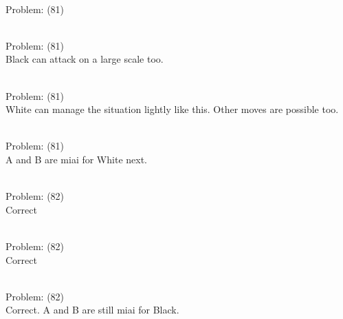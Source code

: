 \documentclass[11pt]{article}
\begin{document}
\begin{minipage}[t]{0.5\textwidth}
  {\centering
  
\\
Problem: (81)\\
  }
\end{minipage}
\begin{minipage}[t]{0.5\textwidth}
  {\centering
  
\\
Problem: (81)\\
Black can attack on a large scale too.\\
  }
\end{minipage}
\begin{minipage}[t]{0.5\textwidth}
  {\centering
  
\\
Problem: (81)\\
White can manage the situation lightly like this. Other moves are possible too.\\
  }
\end{minipage}
\begin{minipage}[t]{0.5\textwidth}
  {\centering
  
\\
Problem: (81)\\
A and B are miai for White next.\\
  }
\end{minipage}
\begin{minipage}[t]{0.5\textwidth}
  {\centering
  
\\
Problem: (82)\\
Correct\\
  }
\end{minipage}
\begin{minipage}[t]{0.5\textwidth}
  {\centering
  
\\
Problem: (82)\\
Correct\\
  }
\end{minipage}
\begin{minipage}[t]{0.5\textwidth}
  {\centering
  
\\
Problem: (82)\\
Correct. A and B are still miai for Black.\\
  }
\end{minipage}
\end{document}
